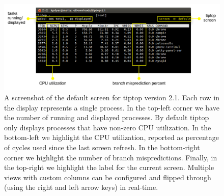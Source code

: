 \begin{figure}[t]
\footnotesize
\centering
\includegraphics[width=1\textwidth]{tiptop-default}
\caption{A screenshot of the default screen for tiptop version 2.1. Each row in the display represents a single process.
In the top-left corner we have the number of running and displayed processes.
By default tiptop only displays processes that have non-zero CPU utilization.
In the bottom-left we highlight the CPU utilization, reported as percentage of cycles used since the last screen refresh.
In the bottom-right corner we highlight the number of branch mispredictions.
Finally, in the top-right we highlight the label for the current screen.
Multiple views with custom columns can be configured and flipped through (using the right and left arrow keys) in real-time.}
\label{fig:tiptop-default}
\end{figure}
